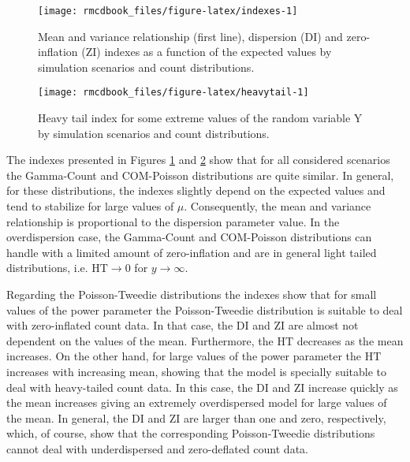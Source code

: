 \documentclass[9pt,a5paper,]{book}
\theoremstyle{definition}
\theoremstyle{definition}
\theoremstyle{remark}
\begin{document}
\begin{figure}[h]

{\centering \texttt{[image: rmcdbook\_files/figure-latex/indexes-1]} 

}

\caption{Mean and variance relationship (first line), dispersion (DI) and zero-inflation (ZI) indexes as a function of the expected values by simulation scenarios and count distributions.}\label{fig:indexes}
\end{figure}

\begin{figure}[h]

{\centering \texttt{[image: rmcdbook\_files/figure-latex/heavytail-1]} 

}

\caption{Heavy tail index for some extreme values of the random variable Y by simulation scenarios and count distributions.}\label{fig:heavytail}
\end{figure}

The indexes presented in Figures \ref{fig:indexes} and
\ref{fig:heavytail} show that for all considered scenarios the
Gamma-Count and COM-Poisson distributions are quite similar. In general,
for these distributions, the indexes slightly depend on the expected
values and tend to stabilize for large values of \(\mu\). Consequently,
the mean and variance relationship is proportional to the dispersion
parameter value. In the overdispersion case, the Gamma-Count and
COM-Poisson distributions can handle with a limited amount of
zero-inflation and are in general light tailed distributions, i.e.
\(\mathrm{HT} \to 0\) for \(y \to \infty\).

Regarding the Poisson-Tweedie distributions the indexes show that for
small values of the power parameter the Poisson-Tweedie distribution is
suitable to deal with zero-inflated count data. In that case, the
\(\mathrm{DI}\) and \(\mathrm{ZI}\) are almost not dependent on the
values of the mean. Furthermore, the \(\mathrm{HT}\) decreases as the
mean increases. On the other hand, for large values of the power
parameter the \(\mathrm{HT}\) increases with increasing mean, showing
that the model is specially suitable to deal with heavy-tailed count
data. In this case, the \(\mathrm{DI}\) and \(\mathrm{ZI}\) increase
quickly as the mean increases giving an extremely overdispersed model
for large values of the mean. In general, the \(\mathrm{DI}\) and
\(\mathrm{ZI}\) are larger than one and zero, respectively, which, of
course, show that the corresponding Poisson-Tweedie distributions cannot
deal with underdispersed and zero-deflated count data.
\end{document}
